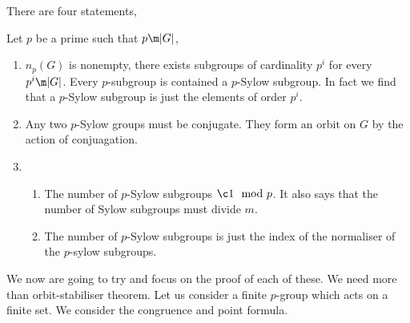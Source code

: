 There are four statements,
\begin{nthm}
  Let $p$ be a prime such that $p \m |G|$,
  \begin{enumerate}
    \item $n_p(G)$ is nonempty, there exists subgroups of cardinality $p^i$ for every $p^i \m |G|$. Every $p$-subgroup is contained a $p$-Sylow subgroup. In fact we find that a $p$-Sylow subgroup is just the elements of order $p^i$.
    \item Any two $p$-Sylow groups must be conjugate. They form an orbit on $G$ by the action of conjuagation.
    \item \begin{enumerate}
      \item The number of $p$-Sylow subgroups $\c 1 \mod p$. It also says that the number of Sylow subgroups must divide $m$.
      \item The number of $p$-Sylow subgroups is just the index of the normaliser of the $p$-sylow subgroups.
    \end{enumerate}
  \end{enumerate}
\end{nthm}

We now are going to try and focus on the proof of each of these. We need more than orbit-stabiliser theorem. Let us consider a finite $p$-group which acts on a finite set. We consider the congruence and point formula.\\


